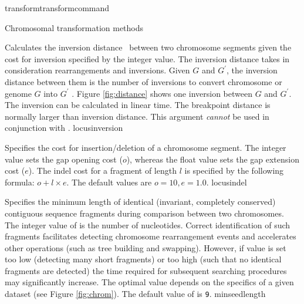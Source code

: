 \begin{command}{transform}{transformcommand}
\begin{arguments}
\begin{argumentgroup}{Chromosomal transformation methods}
\begin{description}
                        {Calculates the inversion distance~\cite{hanenhalliandpevzner1995}
                        between two chromosome segments given the cost for inversion
                        specified by the integer value. The inversion distance
                        takes in consideration rearrangements and
                        inversions. Given $G$ and $G^\prime$, the inversion distance between
                        them is the number of inversions to convert chromosome or genome $G$ 
                        into $G^\prime$ \cite{hanenhalliandpevzner1995}. Figure \ref{fig:distance} shows one inversion  
                        between $G$ and $G^\prime$. The inversion can be calculated in linear time.
                        The breakpoint distance is normally larger than inversion distance.
                        This argument \emph{cannot} be used in conjunction with .} 
                        {locusinversion}  

                        {Specifies the cost for insertion/deletion of a
                        chromosome segment. The integer value sets the gap opening
                        cost ($o$), whereas the float value sets the gap extension
                        cost ($e$).  The indel cost for a fragment of length $l$ is
                        specified by the following formula:
                       $o + l \times e$. The default values are $o=10, e=1.0$.}
                        {locusindel}

                        {Specifies the minimum length of identical (invariant,
                        completely conserved) contiguous sequence fragments
                        during comparison between two chromosomes. The integer
                        value of  is the number of
                        nucleotides. Correct identification of such fragments
                        facilitates detecting chromosome rearrangement events and
                        accelerates other operations (such as tree building and
                        swapping). However, if  value
                        is set too low (detecting many short fragments) or
                        too high (such that no identical fragments are detected)
                        the time required for subsequent searching procedures
                        may significantly increase. The optimal  
                        value depends on the specifics of  a given dataset (see Figure \ref{fig:chrom}).
                        The default value of  is \texttt{9}.}
                        {minseedlength}


\end{description}
\end{argumentgroup}
\end{arguments}
\end{command}
